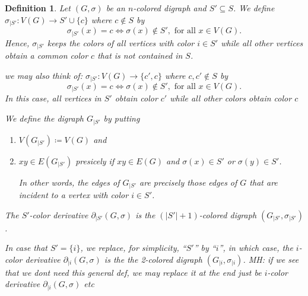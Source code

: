 \documentclass[final,3p,times]{elsarticle}
\newtheorem{definition}{Definition}[section]
\newcommand{\TODO}[1]{\begingroup\color{red}#1\endgroup}
\newcommand{\mh}[1]{\begingroup\color{blue}#1\endgroup}
\begin{document}
\begin{definition}
\label{def:color-derivative}
\mh{Let $(G,\sigma)$ be an $n$-colored digraph and $S'\subseteq S$. We
    define $\sigma_{|S'}\colon V(G) \to S'\cup \{c\}$ where $c\notin S$ by
    \[\sigma_{|S'}(x)=c \iff \sigma(x)\notin S', \text{ for all } x\in V(G).\] 
    Hence, $\sigma_{|S'}$ keeps the colors of all vertices with
    color $i\in S'$ while all other vertices obtain a common color $c$ that is
    not contained in $S$. 

    \TODO{we may also think of:
    $\sigma_{|S'}\colon V(G) \to \{c',c\}$ where $c,c'\notin S$ by
    \[\sigma_{|S'}(x)=c \iff \sigma(x)\notin S', \text{ for all } x\in V(G).\] 
    In this case, all vertices in $S'$ obtain color $c'$ while all other colors obtain
    color $c$}
    
    We define the digraph $G_{|S'}$ by putting
\begin{enumerate}
    \item $V(G_{|S'}) \coloneqq V(G)$ and
    
    \item $xy\in E(G_{|S'})$  presicely if $xy\in E(G)$ and 
    	  $\sigma(x)\in S'$ or  $\sigma(y)\in S'$.
    	  
    	  In other words, the edges of $G_{|S'}$ are precisely those edges 
    	  of $G$ that are incident to a vertex with color $i\in S'$.
\end{enumerate}
%
	The \emph{$S'$-color derivative} $\partial_{|S'}(G,\sigma)$ is the
	$(|S'|+1)$-colored digraph $(G_{|S'},\sigma_{|S'})$. 
	
	
	In case that $S' = \{i\}$, we replace, for simplicity, ``$S'$'' by ``$i$'',
	in which case, the $i$-color derivative $\partial_{|i}(G,\sigma)$ is
	the the 2-colored digraph $(G_{|i},\sigma_{|i})$.
}
\TODO{\small MH: if we see that we dont need this general def, we may replace it at the end 
just be $i$-color derivative $\partial_{|i}(G,\sigma)$ etc }
\end{definition} 
\end{document}
